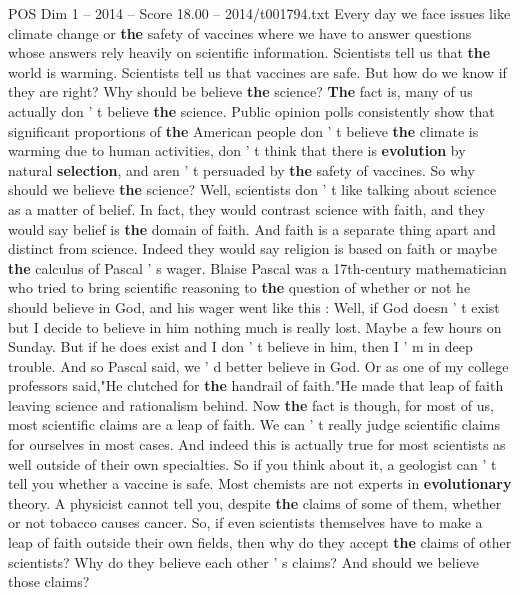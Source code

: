 \begin{textsample}{POS Dim 1 – 2014 – Score 18.00 – 2014/t001794.txt}  \label{ex:f1_pos_047}
Every day we face issues like climate change or \textbf{the} safety of vaccines where we have to answer questions whose answers rely heavily on scientific information.
Scientists tell us that \textbf{the} world is warming.
Scientists tell us that vaccines are safe.
But how do we know if they are right?
Why should be believe \textbf{the} science? \textbf{The} fact is, many of us actually don ' t believe \textbf{the} science.
Public opinion polls consistently show that significant proportions of \textbf{the} American people don ' t believe \textbf{the} climate is warming due to human activities, don ' t think that there is \textbf{evolution} by natural \textbf{selection}, and aren ' t persuaded by \textbf{the} safety of vaccines.
So why should we believe \textbf{the} science?
Well, scientists don ' t like talking about science as a matter of belief.
In fact, they would contrast science with faith, and they would say belief is \textbf{the} domain of faith.
And faith is a separate thing apart and distinct from science.
Indeed they would say religion is based on faith or maybe \textbf{the} calculus of Pascal ' s wager.
Blaise Pascal was a 17th-century mathematician who tried to bring scientific reasoning to \textbf{the} question of whether or not he should believe in God, and his wager went like this : Well, if God doesn ' t exist but I decide to believe in him nothing much is really lost.
Maybe a few hours on Sunday.
But if he does exist and I don ' t believe in him, then I ' m in deep trouble.
And so Pascal said, we ' d better believe in God.
Or as one of my college professors said,"He clutched for \textbf{the} handrail of faith."He made that leap of faith leaving science and rationalism behind.
Now \textbf{the} fact is though, for most of us, most scientific claims are a leap of faith.
We can ' t really judge scientific claims for ourselves in most cases.
And indeed this is actually true for most scientists as well outside of their own specialties.
So if you think about it, a geologist can ' t tell you whether a vaccine is safe.
Most chemists are not experts in \textbf{evolutionary} theory.
A physicist cannot tell you, despite \textbf{the} claims of some of them, whether or not tobacco causes cancer.
So, if even scientists themselves have to make a leap of faith outside their own fields, then why do they accept \textbf{the} claims of other scientists?
Why do they believe each other ' s claims?
And should we believe those claims?

\end{textsample}
